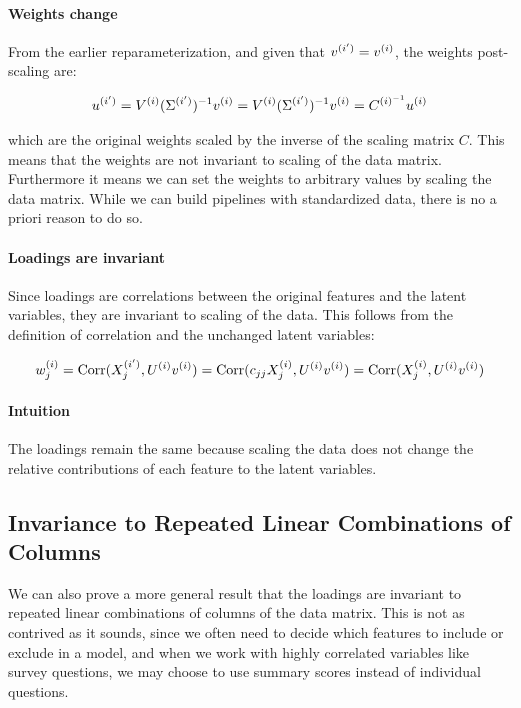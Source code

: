 \paragraph{Weights change}

From the earlier reparameterization, and given that $v^{(i')}=v^{(i)}$, the weights post-scaling are:

\begin{align}
    u^{(i')} = V^{(i)}(\Sigma^{(i')})^{-1}v^{(i)} = V^{(i)}(\Sigma^{(i')})^{-1}v^{(i)} = C^{{(i)}^{-1}}u^{(i)} \label{eq:weights_change2}
\end{align}

which are the original weights scaled by the inverse of the scaling matrix \( C \). This means that the weights are not invariant to scaling of the data matrix. Furthermore it means we can set the weights to arbitrary values by scaling the data matrix.
While we can build pipelines with standardized data, there is no a priori reason to do so.

\paragraph{Loadings are invariant}

Since \gls{loadings} are correlations between the original features and the latent variables, they are invariant to scaling of the data.
This follows from the definition of correlation and the unchanged latent variables:

\begin{align}
    w^{(i)}_j = \operatorname{Corr}(X^{(i')}_j, U^{(i)}v^{(i)}) = \operatorname{Corr}(c_{jj}X^{(i)}_j, U^{(i)}v^{(i)}) = \operatorname{Corr}(X^{(i)}_j, U^{(i)}v^{(i)}) \label{eq:loading_invariant}
\end{align}

\paragraph{Intuition}
The \gls{loadings} remain the same because scaling the data does not change the relative contributions of each feature to the latent variables.

\subsection{Invariance to Repeated Linear Combinations of Columns}\label{subsubsec:invariance-to-linear-combinations}

We can also prove a more general result that the \gls{loadings} are invariant to repeated linear combinations of columns of the data matrix.
This is not as contrived as it sounds, since we often need to decide which features to include or exclude in a model, and when we work with highly correlated variables like survey questions, we may choose to use summary scores instead of individual questions.

